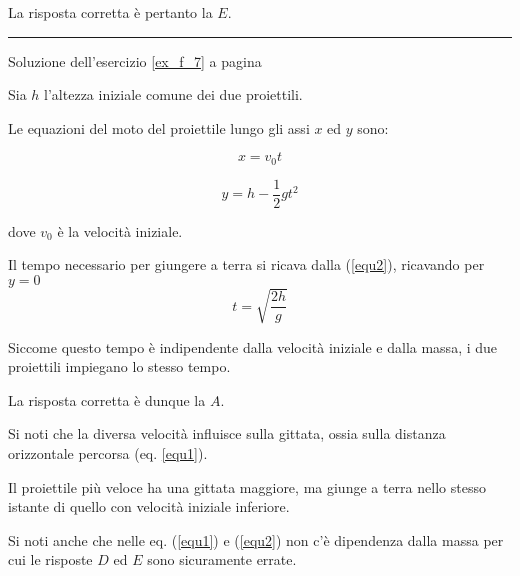 La risposta corretta è pertanto la $E$.


\vspace{1cm}
\hrule
\vspace{1cm}

Soluzione dell'esercizio \ref{ex_f_7} a pagina \pageref{ex_f_7}\label{sol_f_7}

Sia $h$ l’altezza iniziale comune dei due proiettili.

Le equazioni del moto del proiettile lungo gli assi $x$ ed $y$ sono:

\begin{equation}\label{equ1}
x=v_0t 
\end{equation}

\begin{equation}\label{equ2}
y=h-\frac{1}{2}gt^2
\end{equation}

dove $v_0$ è la velocità iniziale.

Il tempo necessario per giungere a terra si ricava dalla (\ref{equ2}), ricavando per $y=0$
\[
t=\sqrt{\frac{2h}{g}}
\]

Siccome questo tempo è indipendente dalla velocità iniziale e dalla massa, i due proiettili impiegano lo stesso tempo.

La risposta corretta è dunque la $A$.

Si noti che la diversa velocità influisce sulla gittata, ossia sulla distanza orizzontale percorsa (eq. \ref{equ1}).

Il proiettile più veloce ha una gittata maggiore, ma giunge a terra nello stesso istante di quello
con velocità iniziale inferiore.

Si noti anche che nelle eq. (\ref{equ1}) e (\ref{equ2}) non c’è dipendenza dalla
massa per cui le risposte $D$ ed $E$ sono sicuramente errate.


% 





